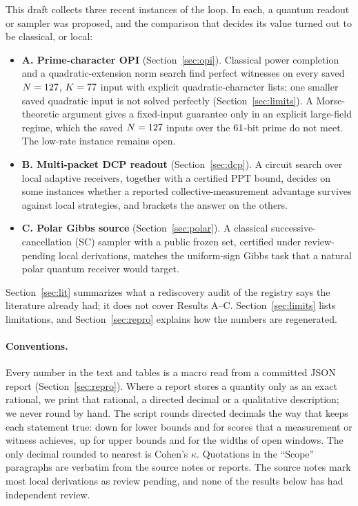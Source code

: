 \documentclass[10pt]{article}
\begin{document}
This draft collects three recent instances of the loop. In each, a quantum readout or sampler was proposed, and the comparison that decides its value turned out to be classical, or local:
\begin{itemize}
\item \textbf{A. Prime-character OPI} (Section~\ref{sec:opi}). Classical power completion and a quadratic-extension norm search find perfect witnesses on every saved $N=127$, $K=77$ input with explicit quadratic-character lists; one smaller saved quadratic input is not solved perfectly (Section~\ref{sec:limits}). A Morse-theoretic argument gives a fixed-input guarantee only in an explicit large-field regime, which the saved $N=127$ inputs over the $61$-bit prime do not meet. The low-rate instance remains open.
\item \textbf{B. Multi-packet DCP readout} (Section~\ref{sec:dcp}). A circuit search over local adaptive receivers, together with a certified PPT bound, decides on some instances whether a reported collective-measurement advantage survives against local strategies, and brackets the answer on the others.
\item \textbf{C. Polar Gibbs source} (Section~\ref{sec:polar}). A classical successive-cancellation (SC) sampler with a public frozen set, certified under review-pending local derivations, matches the uniform-sign Gibbs task that a natural polar quantum receiver would target.
\end{itemize}
Section~\ref{sec:lit} summarizes what a rediscovery audit of the registry says the literature already had; it does not cover Results A--C. Section~\ref{sec:limits} lists limitations, and Section~\ref{sec:repro} explains how the numbers are regenerated.

\paragraph{Conventions.} Every number in the text and tables is a macro read from a committed JSON report (Section~\ref{sec:repro}). Where a report stores a quantity only as an exact rational, we print that rational, a directed decimal or a qualitative description; we never round by hand. The script rounds directed decimals the way that keeps each statement true: down for lower bounds and for scores that a measurement or witness achieves, up for upper bounds and for the widths of open windows. The only decimal rounded to nearest is Cohen's $\kappa$. Quotations in the ``Scope'' paragraphs are verbatim from the source notes or reports. The source notes mark most local derivations as review pending, and none of the results below has had independent review.
\end{document}
